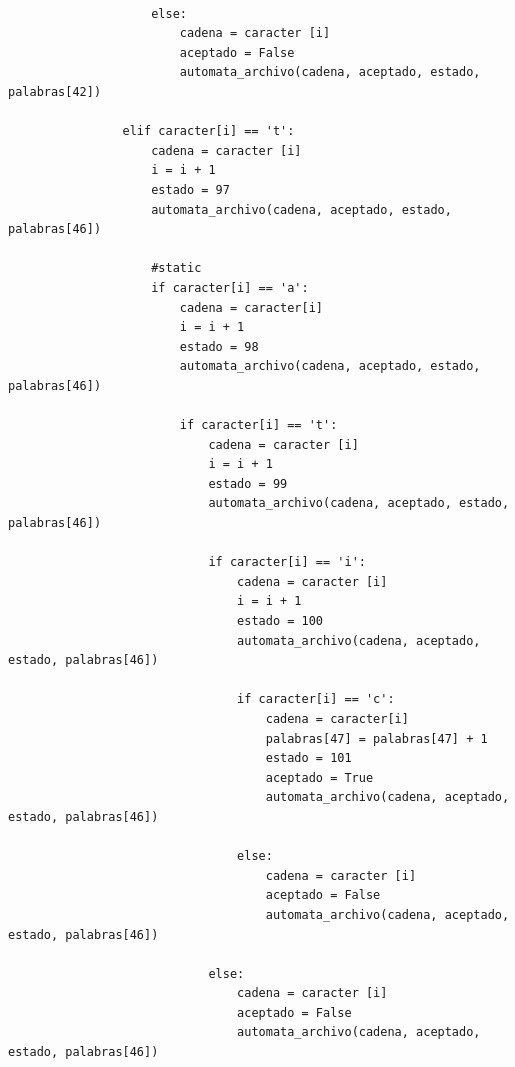 \documentclass{article}
\begin{document}
\begin{flushleft}
\begin{lstlisting}
                        
                    else:
                        cadena = caracter [i]
                        aceptado = False
                        automata_archivo(cadena, aceptado, estado, palabras[42])
                        
                elif caracter[i] == 't':
                    cadena = caracter [i]
                    i = i + 1
                    estado = 97
                    automata_archivo(cadena, aceptado, estado, palabras[46])
                    
                    #static
                    if caracter[i] == 'a':
                        cadena = caracter[i]
                        i = i + 1
                        estado = 98
                        automata_archivo(cadena, aceptado, estado, palabras[46])
                        
                        if caracter[i] == 't':
                            cadena = caracter [i]
                            i = i + 1
                            estado = 99
                            automata_archivo(cadena, aceptado, estado, palabras[46])   
                            
                            if caracter[i] == 'i':
                                cadena = caracter [i]
                                i = i + 1
                                estado = 100
                                automata_archivo(cadena, aceptado, estado, palabras[46])
                                
                                if caracter[i] == 'c':
                                    cadena = caracter[i]
                                    palabras[47] = palabras[47] + 1
                                    estado = 101
                                    aceptado = True
                                    automata_archivo(cadena, aceptado, estado, palabras[46])
                                    
                                else:
                                    cadena = caracter [i]
                                    aceptado = False
                                    automata_archivo(cadena, aceptado, estado, palabras[46])
                                    
                            else:
                                cadena = caracter [i]
                                aceptado = False
                                automata_archivo(cadena, aceptado, estado, palabras[46])
                        

\end{lstlisting}
\end{flushleft}
\end{document}
